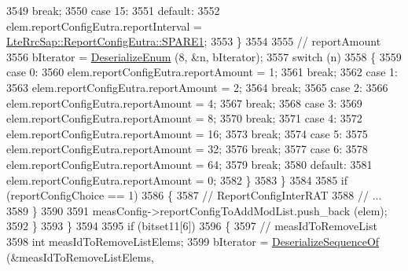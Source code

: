 \begin{DoxyCode}
3549                   \textcolor{keywordflow}{break};
3550                 \textcolor{keywordflow}{case} 15:
3551                 \textcolor{keywordflow}{default}:
3552                   elem.reportConfigEutra.reportInterval = 
      \hyperlink{structns3_1_1LteRrcSap_1_1ReportConfigEutra_aa04b2781a844eb212d59762829e41d31aed677eaac05fba9b1c1632773b93888e}{LteRrcSap::ReportConfigEutra::SPARE1};
3553                 \}
3554 
3555               \textcolor{comment}{// reportAmount}
3556               bIterator = \hyperlink{classns3_1_1Asn1Header_a4fcc253e0eec3483c775b005c1875f2d}{DeserializeEnum} (8, &n, bIterator);
3557               \textcolor{keywordflow}{switch} (n)
3558                 \{
3559                 \textcolor{keywordflow}{case} 0:
3560                   elem.reportConfigEutra.reportAmount = 1;
3561                   \textcolor{keywordflow}{break};
3562                 \textcolor{keywordflow}{case} 1:
3563                   elem.reportConfigEutra.reportAmount = 2;
3564                   \textcolor{keywordflow}{break};
3565                 \textcolor{keywordflow}{case} 2:
3566                   elem.reportConfigEutra.reportAmount = 4;
3567                   \textcolor{keywordflow}{break};
3568                 \textcolor{keywordflow}{case} 3:
3569                   elem.reportConfigEutra.reportAmount = 8;
3570                   \textcolor{keywordflow}{break};
3571                 \textcolor{keywordflow}{case} 4:
3572                   elem.reportConfigEutra.reportAmount = 16;
3573                   \textcolor{keywordflow}{break};
3574                 \textcolor{keywordflow}{case} 5:
3575                   elem.reportConfigEutra.reportAmount = 32;
3576                   \textcolor{keywordflow}{break};
3577                 \textcolor{keywordflow}{case} 6:
3578                   elem.reportConfigEutra.reportAmount = 64;
3579                   \textcolor{keywordflow}{break};
3580                 \textcolor{keywordflow}{default}:
3581                   elem.reportConfigEutra.reportAmount = 0;
3582                 \}
3583             \}
3584 
3585           \textcolor{keywordflow}{if} (reportConfigChoice == 1)
3586             \{
3587               \textcolor{comment}{// ReportConfigInterRAT}
3588               \textcolor{comment}{// ...}
3589             \}
3590 
3591           measConfig->reportConfigToAddModList.push\_back (elem);
3592         \}
3593     \}
3594 
3595   \textcolor{keywordflow}{if} (bitset11[6])
3596     \{
3597       \textcolor{comment}{// measIdToRemoveList}
3598       \textcolor{keywordtype}{int} measIdToRemoveListElems;
3599       bIterator = \hyperlink{classns3_1_1Asn1Header_a1a7245e05b482df8abade0a060bd0ecc}{DeserializeSequenceOf} (&measIdToRemoveListElems, 

\end{DoxyCode}
